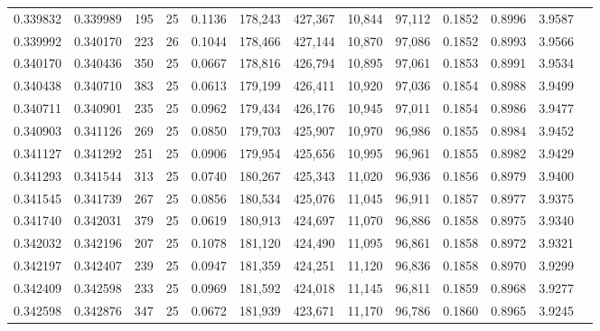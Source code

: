\begin{tabular}{rrrrrrrrrrrrr}
0.339832 & 0.339989 &   195 &  25 &                                     0.1136 & 178,243 & 427,367 &  10,844 &  97,112 & 0.1852 & 0.8996 & 3.9587 \\
0.339992 & 0.340170 &   223 &  26 &                                     0.1044 & 178,466 & 427,144 &  10,870 &  97,086 & 0.1852 & 0.8993 & 3.9566 \\
0.340170 & 0.340436 &   350 &  25 &                                     0.0667 & 178,816 & 426,794 &  10,895 &  97,061 & 0.1853 & 0.8991 & 3.9534 \\
0.340438 & 0.340710 &   383 &  25 &                                     0.0613 & 179,199 & 426,411 &  10,920 &  97,036 & 0.1854 & 0.8988 & 3.9499 \\
0.340711 & 0.340901 &   235 &  25 &                                     0.0962 & 179,434 & 426,176 &  10,945 &  97,011 & 0.1854 & 0.8986 & 3.9477 \\
0.340903 & 0.341126 &   269 &  25 &                                     0.0850 & 179,703 & 425,907 &  10,970 &  96,986 & 0.1855 & 0.8984 & 3.9452 \\
0.341127 & 0.341292 &   251 &  25 &                                     0.0906 & 179,954 & 425,656 &  10,995 &  96,961 & 0.1855 & 0.8982 & 3.9429 \\
0.341293 & 0.341544 &   313 &  25 &                                     0.0740 & 180,267 & 425,343 &  11,020 &  96,936 & 0.1856 & 0.8979 & 3.9400 \\
0.341545 & 0.341739 &   267 &  25 &                                     0.0856 & 180,534 & 425,076 &  11,045 &  96,911 & 0.1857 & 0.8977 & 3.9375 \\
0.341740 & 0.342031 &   379 &  25 &                                     0.0619 & 180,913 & 424,697 &  11,070 &  96,886 & 0.1858 & 0.8975 & 3.9340 \\
0.342032 & 0.342196 &   207 &  25 &                                     0.1078 & 181,120 & 424,490 &  11,095 &  96,861 & 0.1858 & 0.8972 & 3.9321 \\
0.342197 & 0.342407 &   239 &  25 &                                     0.0947 & 181,359 & 424,251 &  11,120 &  96,836 & 0.1858 & 0.8970 & 3.9299 \\
0.342409 & 0.342598 &   233 &  25 &                                     0.0969 & 181,592 & 424,018 &  11,145 &  96,811 & 0.1859 & 0.8968 & 3.9277 \\
0.342598 & 0.342876 &   347 &  25 &                                     0.0672 & 181,939 & 423,671 &  11,170 &  96,786 & 0.1860 & 0.8965 & 3.9245 \\

\end{tabular}
